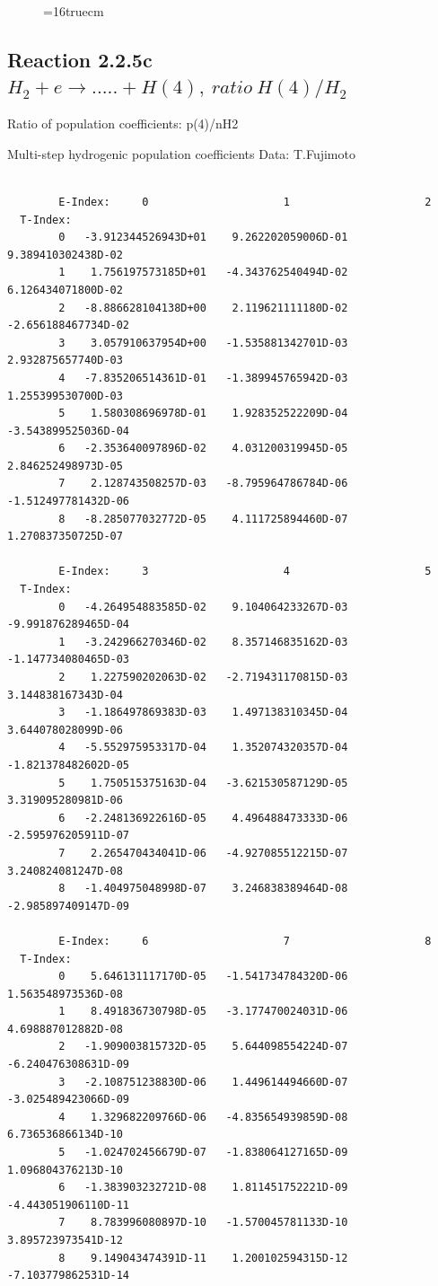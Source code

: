 \documentclass[12pt,dvips]{article}
\begin{document}
\begin{figure} \label{2.2.5b}
\epsfxsize=16truecm
\end{figure}
\newpage

\subsection{
Reaction 2.2.5c  $H_2 + e \rightarrow .....+H(4)   , \  ratio ~ H(4)/H_2 $
}

 Ratio of population coefficients: p(4)/nH2

 Multi-step hydrogenic population coefficients
 Data: T.Fujimoto

\begin{small}\begin{verbatim}

        E-Index:     0                     1                     2
  T-Index:
        0   -3.912344526943D+01    9.262202059006D-01    9.389410302438D-02
        1    1.756197573185D+01   -4.343762540494D-02    6.126434071800D-02
        2   -8.886628104138D+00    2.119621111180D-02   -2.656188467734D-02
        3    3.057910637954D+00   -1.535881342701D-03    2.932875657740D-03
        4   -7.835206514361D-01   -1.389945765942D-03    1.255399530700D-03
        5    1.580308696978D-01    1.928352522209D-04   -3.543899525036D-04
        6   -2.353640097896D-02    4.031200319945D-05    2.846252498973D-05
        7    2.128743508257D-03   -8.795964786784D-06   -1.512497781432D-06
        8   -8.285077032772D-05    4.111725894460D-07    1.270837350725D-07

        E-Index:     3                     4                     5
  T-Index:
        0   -4.264954883585D-02    9.104064233267D-03   -9.991876289465D-04
        1   -3.242966270346D-02    8.357146835162D-03   -1.147734080465D-03
        2    1.227590202063D-02   -2.719431170815D-03    3.144838167343D-04
        3   -1.186497869383D-03    1.497138310345D-04    3.644078028099D-06
        4   -5.552975953317D-04    1.352074320357D-04   -1.821378482602D-05
        5    1.750515375163D-04   -3.621530587129D-05    3.319095280981D-06
        6   -2.248136922616D-05    4.496488473333D-06   -2.595976205911D-07
        7    2.265470434041D-06   -4.927085512215D-07    3.240824081247D-08
        8   -1.404975048998D-07    3.246838389464D-08   -2.985897409147D-09

        E-Index:     6                     7                     8
  T-Index:
        0    5.646131117170D-05   -1.541734784320D-06    1.563548973536D-08
        1    8.491836730798D-05   -3.177470024031D-06    4.698887012882D-08
        2   -1.909003815732D-05    5.644098554224D-07   -6.240476308631D-09
        3   -2.108751238830D-06    1.449614494660D-07   -3.025489423066D-09
        4    1.329682209766D-06   -4.835654939859D-08    6.736536866134D-10
        5   -1.024702456679D-07   -1.838064127165D-09    1.096804376213D-10
        6   -1.383903232721D-08    1.811451752221D-09   -4.443051906110D-11
        7    8.783996080897D-10   -1.570045781133D-10    3.895723973541D-12
        8    9.149043474391D-11    1.200102594315D-12   -7.103779862531D-14


\end{verbatim}
\end{small}
\end{document}
